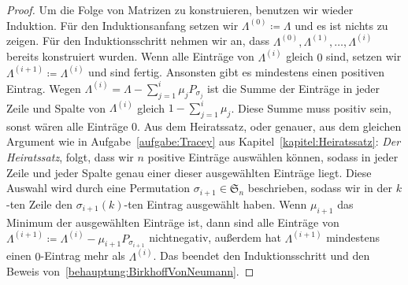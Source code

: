 \begin{proof}
	Um die Folge von Matrizen zu konstruieren, benutzen wir wieder Induktion. Für den Induktionsanfang setzen wir $\Lambda^{(0)}\coloneqq \Lambda$ und es ist nichts zu zeigen. Für den Induktionsschritt nehmen wir an, dass $\Lambda^{(0)},\Lambda^{(1)},\dotsc,\Lambda^{(i)}$ bereits konstruiert wurden. Wenn alle Einträge von $\Lambda^{(i)}$ gleich $0$ sind, setzen wir $\Lambda^{(i+1)}\coloneqq \Lambda^{(i)}$ und sind fertig. Ansonsten gibt es mindestens einen positiven Eintrag. Wegen $\Lambda^{(i)}=\Lambda-\sum_{j=1}^i\mu_jP_{\sigma_j}$ ist die Summe der Einträge in jeder Zeile und Spalte von $\Lambda^{(i)}$ gleich $1-\sum_{j=1}^i\mu_j$. Diese Summe muss positiv sein, sonst wären alle Einträge $0$. Aus dem Heiratssatz, oder genauer, aus dem gleichen Argument wie in Aufgabe~\ref{aufgabe:Tracey} aus Kapitel~\ref{kapitel:Heiratssatz}: \emph{Der Heiratssatz}, folgt, dass wir $n$ positive Einträge auswählen können, sodass in jeder Zeile und jeder Spalte genau einer dieser ausgewählten Einträge liegt. Diese Auswahl wird durch eine Permutation $\sigma_{i+1}\in\mathfrak S_n$ beschrieben, sodass wir in der $k$-ten Zeile den $\sigma_{i+1}(k)$-ten Eintrag ausgewählt haben. Wenn $\mu_{i+1}$ das Minimum der ausgewählten Einträge ist, dann sind alle Einträge von $\Lambda^{(i+1)}\coloneqq \Lambda^{(i)}-\mu_{i+1} P_{\sigma_{i+1}}$ nichtnegativ, außerdem hat $\Lambda^{(i+1)}$ mindestens einen $0$-Eintrag mehr als $\Lambda^{(i)}$. Das beendet den Induktionsschritt und den Beweis von~\ref{behauptung:BirkhoffVonNeumann}.
\end{proof}
